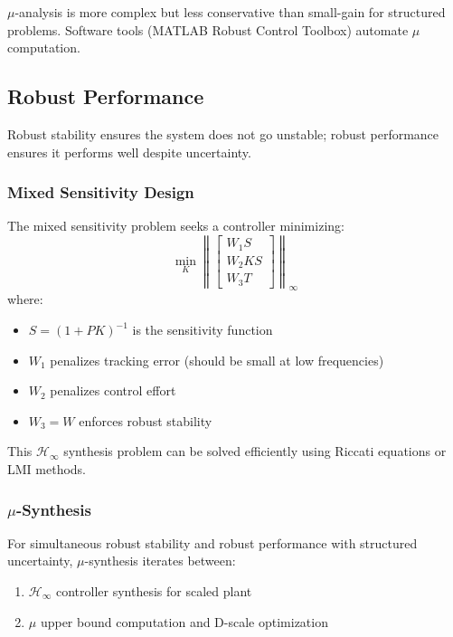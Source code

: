 $\mu$-analysis is more complex but less conservative than small-gain for structured problems. Software tools (MATLAB Robust Control Toolbox) automate $\mu$ computation.

\subsection{Robust Performance}

Robust stability ensures the system does not go unstable; robust performance ensures it performs well despite uncertainty.

\subsubsection{Mixed Sensitivity Design}

The mixed sensitivity problem seeks a controller minimizing:
\begin{equation}
\min_K \left\| \begin{bmatrix} W_1 S \\ W_2 KS \\ W_3 T \end{bmatrix} \right\|_\infty
\label{eq:mixed_sensitivity}
\end{equation}
where:
\begin{itemize}
    \item $S = (1 + PK)^{-1}$ is the sensitivity function
    \item $W_1$ penalizes tracking error (should be small at low frequencies)
    \item $W_2$ penalizes control effort
    \item $W_3 = W$ enforces robust stability
\end{itemize}

This $\mathcal{H}_\infty$ synthesis problem can be solved efficiently using Riccati equations or LMI methods.

\subsubsection{$\mu$-Synthesis}

For simultaneous robust stability and robust performance with structured uncertainty, $\mu$-synthesis iterates between:
\begin{enumerate}
    \item $\mathcal{H}_\infty$ controller synthesis for scaled plant
    \item $\mu$ upper bound computation and D-scale optimization
\end{enumerate}

